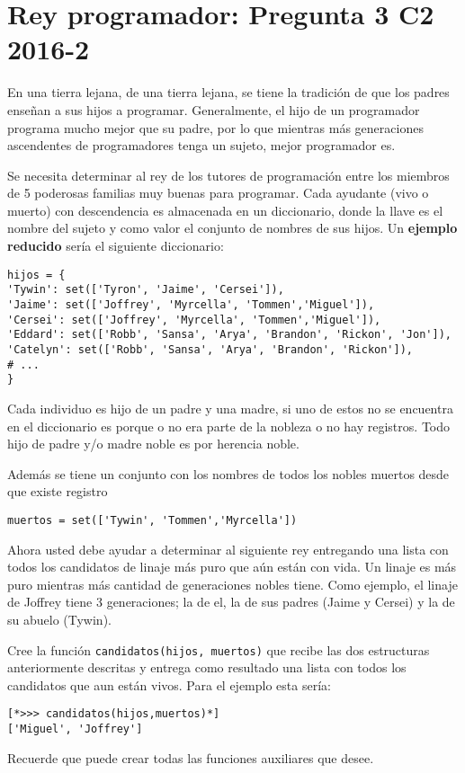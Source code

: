 \section{Rey programador: Pregunta 3 C2 2016-2}
En una tierra lejana, de una tierra lejana, se tiene la tradición de que los padres enseñan a sus hijos a programar. Generalmente, el hijo de un programador programa mucho mejor que su padre, por lo que mientras más generaciones ascendentes de programadores tenga un sujeto, mejor programador es.

Se necesita determinar al rey de los tutores de programación entre los miembros de 5 poderosas familias muy buenas para programar. Cada ayudante (vivo o muerto) con descendencia es almacenada en un diccionario, donde la llave es el nombre del sujeto y como valor el conjunto de nombres de sus hijos. Un \textbf{ejemplo reducido} sería el siguiente diccionario:

\begin{lstlisting}[style=consola]
hijos = {
'Tywin': set(['Tyron', 'Jaime', 'Cersei']),
'Jaime': set(['Joffrey', 'Myrcella', 'Tommen','Miguel']),
'Cersei': set(['Joffrey', 'Myrcella', 'Tommen','Miguel']),
'Eddard': set(['Robb', 'Sansa', 'Arya', 'Brandon', 'Rickon', 'Jon']),
'Catelyn': set(['Robb', 'Sansa', 'Arya', 'Brandon', 'Rickon']),
# ...
}
\end{lstlisting}

Cada individuo es hijo de un padre y una madre, si uno de estos no se encuentra en el diccionario es porque o no era parte de la nobleza o no hay registros. Todo hijo de padre y/o madre noble es por herencia noble.

Además se tiene un conjunto con los nombres de todos los nobles muertos desde que existe registro

\begin{lstlisting}[style=consola]
muertos = set(['Tywin', 'Tommen','Myrcella'])
\end{lstlisting}

Ahora usted debe ayudar a determinar al siguiente rey entregando una lista con todos los candidatos de linaje más puro que aún están con vida. Un linaje es más puro mientras más cantidad de generaciones nobles tiene. Como ejemplo, el linaje de Joffrey tiene 3 generaciones; la
de el, la de sus padres (Jaime y Cersei) y la de su abuelo (Tywin).

Cree la función \texttt{candidatos(hijos, muertos)} que recibe las dos estructuras anteriormente descritas y entrega como resultado una lista con todos los candidatos que aun están vivos. Para el ejemplo esta sería:

\begin{lstlisting}[style=consola]
[*>>> candidatos(hijos,muertos)*]
['Miguel', 'Joffrey']
\end{lstlisting}

Recuerde que puede crear todas las funciones auxiliares que desee.